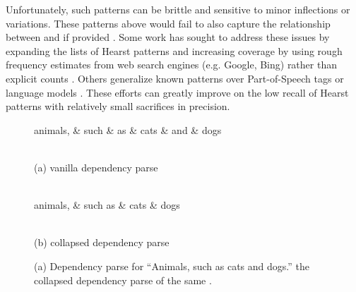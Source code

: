 Unfortunately, such patterns can be brittle and sensitive to minor inflections
or variations.  These patterns above would fail to also capture the
relationship between  and  if provided . Some work
has sought to address these issues by expanding the lists of Hearst
patterns and increasing coverage by using
rough frequency estimates from web search engines (e.g. Google, Bing) rather
than explicit counts \cite{seitner:2016:lrec}. Others generalize known patterns
over Part-of-Speech tags \cite{sang:2007:acl} or language models
\cite{ritter:2009:aaai}. These efforts can greatly improve on the low recall
of Hearst patterns with relatively small sacrifices in precision.

\begin{figure}
\centering
\begin{dependency}[edge vertical padding=0.5ex, edge style={black},
                  label style={fill=black,text=white,font=\ttfamily}]
  \begin{deptext}[column sep=0.7cm,nodes={font=\large}]
    animals, \& such \& as \& cats \& and \& dogs\\
  \end{deptext}
\end{dependency}\\
{\small (a) vanilla dependency parse}\\~\\
\begin{dependency}[edge vertical padding=0.5ex, edge style={black},
                  label style={fill=black,text=white,font=\ttfamily}]
  \begin{deptext}[column sep=0.7cm,nodes={font=\large}]
    animals, \& such as \& cats \& dogs \\
  \end{deptext}
\end{dependency}\\
{\small (b) collapsed dependency parse}\\
\caption{(a) Dependency parse for ``Animals, such
as cats and dogs.'' the collapsed dependency parse of the same
\cite{marneffe:2008:techreport}.}
\label{fig:collapseddep}
\end{figure}

